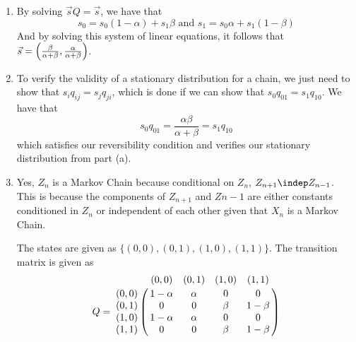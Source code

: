 \documentclass[11.5pt]{article}
\begin{document}
\begin{solution}{5}
\begin{enumerate}
\item By solving $\vec{s} Q = \vec{s}$, we have that
$$s_0 = s_0 (1 - \alpha) + s_1 \beta \textrm{ and } s_1 = s_0 \alpha + s_1 (1 - \beta)$$
And by solving this system of linear equations, it follows that $\vec{s} = \paren{\frac{\beta}{\alpha + \beta}, \frac{\alpha}{\alpha + \beta}}$.

\item To verify the validity of a stationary distribution for a chain, we just need to show that $s_i q_{ij} = s_j q_{ji}$, which is done if we can show that $s_0 q_{01} = s_1 q_{10}$. We have that
$$s_0 q_{01} = \frac{\alpha\beta}{\alpha + \beta} = s_1 q_{10}$$
which satisfies our reversibility condition and verifies our stationary distribution from part (a).

\item Yes, $Z_n$ is a Markov Chain because conditional on $Z_n$, $Z_{n+1} \indep Z_{n-1}$. This is because the components of $Z_{n+1}$ and $Z{n-1}$ are either constants conditioned in $Z_n$ or independent of each other given that $X_n$ is a Markov Chain.

The states are given as $\{ (0, 0), (0, 1), (1, 0), (1, 1) \}$. The transition matrix is given as
\[
Q = \bordermatrix{   ~   & (0, 0) & (0, 1) & (1, 0) & (1, 1) \cr
                  (0, 0) & 1-\alpha & \alpha & 0 & 0 \cr
                  (0, 1) & 0 & 0 & \beta & 1-\beta \cr
                  (1, 0) & 1-\alpha & \alpha & 0 & 0 \cr
                  (1, 1) & 0 & 0 & \beta & 1-\beta \cr
                 }
\]
\end{enumerate}
\end{solution}
\end{document}
